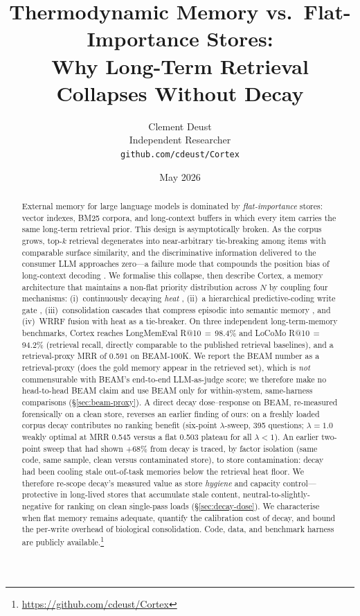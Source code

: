 \documentclass[11pt]{article}
\title{Thermodynamic Memory vs.\ Flat-Importance Stores:\\
Why Long-Term Retrieval Collapses Without Decay}
\author{
  Clement Deust\\
  Independent Researcher\\
  \texttt{github.com/cdeust/Cortex}
}
\date{May 2026}
\begin{document}
\maketitle

\begin{abstract}
External memory for large language models is dominated by
\emph{flat-importance} stores: vector indexes, BM25 corpora, and
long-context buffers in which every item carries the same long-term
retrieval prior.  This design is asymptotically broken.  As the
corpus grows, top-$k$ retrieval degenerates into near-arbitrary
tie-breaking among items with comparable surface similarity, and
the discriminative information delivered to the consumer LLM
approaches zero---a failure mode that compounds the position bias
of long-context decoding \citep{Liu2023}.  We formalise this
collapse, then describe Cortex, a memory architecture that
maintains a non-flat priority distribution across $N$ by coupling
four mechanisms: (i)~continuously decaying \emph{heat}
\citep{Ebbinghaus1885}, (ii)~a hierarchical predictive-coding
write gate \citep{Friston2010}, (iii)~consolidation cascades that
compress episodic into semantic memory
\citep{Kandel2001,McClelland1995}, and (iv)~WRRF fusion with heat
as a tie-breaker.  On three independent long-term-memory
benchmarks, Cortex reaches LongMemEval R@10\,$=$\,98.4\% and
LoCoMo R@10\,$=$\,94.2\% (retrieval recall, directly comparable to
the published retrieval baselines), and a retrieval-proxy MRR of
0.591 on BEAM-100K.  We report the BEAM number as a retrieval-proxy
(does the gold memory appear in the retrieved set), which is
\emph{not} commensurable with BEAM's end-to-end LLM-as-judge score;
we therefore make no head-to-head BEAM claim and use BEAM only for
within-system, same-harness comparisons (\S\ref{sec:beam-proxy}).
A direct decay dose--response on BEAM, re-measured forensically on a
clean store, reverses an earlier finding of ours: on a freshly loaded
corpus decay contributes no ranking benefit (six-point
$\lambda$-sweep, 395 questions; $\lambda = 1.0$ weakly optimal at MRR
0.545 versus a flat 0.503 plateau for all $\lambda < 1$).  An earlier
two-point sweep that had shown $+68\%$ from decay is traced, by
factor isolation (same code, same sample, clean versus contaminated
store), to store contamination: decay had been cooling stale
out-of-task memories below the retrieval heat floor.  We therefore
re-scope decay's measured value as store \emph{hygiene} and capacity
control---protective in long-lived stores that accumulate stale
content, neutral-to-slightly-negative for ranking on clean
single-pass loads (\S\ref{sec:decay-dose}).  We characterise when
flat memory remains adequate, quantify the calibration cost of
decay, and bound the per-write overhead of biological
consolidation.  Code, data, and benchmark harness are publicly
available.\footnote{\url{https://github.com/cdeust/Cortex}}
\end{abstract}
\end{document}
